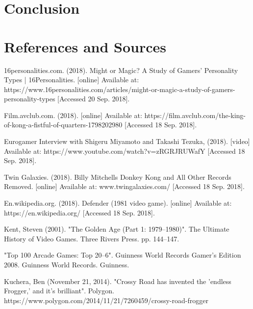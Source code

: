 \documentclass{article}
\begin{document}
\section{Conclusion}

\section{References and Sources}

16personalities.com. (2018). Might or Magic? A Study of Gamers’ Personality Types | 16Personalities. [online] Available at: https://www.16personalities.com/articles/might-or-magic-a-study-of-gamers-personality-types [Accessed 20 Sep. 2018]. \newline

Film.avclub.com. (2018). [online] Available at: https://film.avclub.com/the-king-of-kong-a-fistful-of-quarters-1798202980 [Accessed 18 Sep. 2018]. \newline


Eurogamer Interview with Shigeru Miyamoto and Takashi Tezuka, (2018). [video] Available at: https://www.youtube.com/watch?v=zRGRJRUWafY [Accessed 18 Sep. 2018].

Twin Galaxies. (2018). Billy Mitchells Donkey Kong and All Other Records Removed. [online] Available at: www.twingalaxies.com/ [Accessed 18 Sep. 2018]. \newline

En.wikipedia.org. (2018). Defender (1981 video game). [online] Available at: https://en.wikipedia.org/ [Accessed 18 Sep. 2018]. \newline

Kent, Steven (2001). "The Golden Age (Part 1: 1979–1980)". The Ultimate History of Video Games. Three Rivers Press. pp. 144–147. \newline

 "Top 100 Arcade Games: Top 20–6". Guinness World Records Gamer's Edition 2008. Guinness World Records. Guinness. \newline
 
 Kuchera, Ben (November 21, 2014). "Crossy Road has invented the 'endless Frogger,' and it's brilliant". Polygon. 
 https://www.polygon.com/2014/11/21/7260459/crossy-road-frogger \newline
\end{document}
